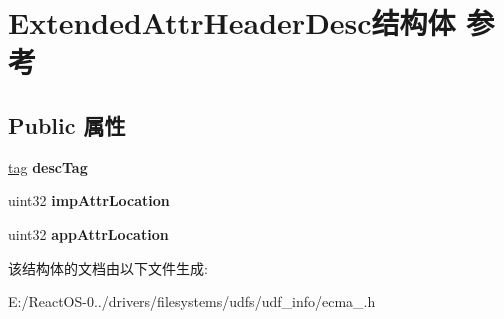 \hypertarget{struct_extended_attr_header_desc}{}\section{Extended\+Attr\+Header\+Desc结构体 参考}
\label{struct_extended_attr_header_desc}
\subsection*{Public 属性}
\begin{DoxyCompactItemize}
\item 
\mbox{\label{struct_extended_attr_header_desc_a55a3f14acc0458da29bcdb8c515bdf43}} 
\hyperlink{structtag}{tag} {\bfseries desc\+Tag}
\item 
\mbox{\label{struct_extended_attr_header_desc_a0b371669f47070c96df8376631d5b597}} 
uint32 {\bfseries imp\+Attr\+Location}
\item 
\mbox{\label{struct_extended_attr_header_desc_abeee9f3d75abc570456ca19bccebddc6}} 
uint32 {\bfseries app\+Attr\+Location}
\end{DoxyCompactItemize}


该结构体的文档由以下文件生成\+:\begin{DoxyCompactItemize}
\item 
E\+:/\+React\+O\+S-\/0../drivers/filesystems/udfs/udf\+\_\+info/ecma\+\_.\+h\end{DoxyCompactItemize}
